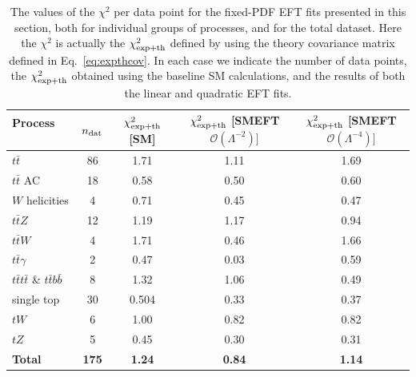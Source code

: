\documentclass[withindex,glossary]{cam-thesis}
\begin{document}
\begin{table}[t!]
\begin{center}
\centering
\renewcommand{\arraystretch}{1.4}
\begin{tabularx}{\textwidth}{lcccc}
\toprule
Process  $\qquad $ & $n_{\rm dat}$ &  {\footnotesize$\chi^2_{\rm exp+th}$ [SM]} & {\footnotesize$\chi^2_{\rm exp+th}$ [SMEFT $\mathcal{O}(\Lambda^{-2})]$ }
& {\footnotesize$\chi^2_{\rm exp+th}$  [SMEFT $\mathcal{O}(\Lambda^{-4})]$}
\\ \midrule
	$t \bar{t}$ & 86 & 1.71 & 1.11 & 1.69 \\
	$t \bar{t}$ AC & 18 & 0.58 & 0.50 & 0.60 \\
	$W$ helicities & 4 & 0.71 & 0.45 & 0.47  \\
        \midrule
        $t\bar{t}Z$ & 12 & 1.19 & 1.17 & 0.94  \\ 
        $t\bar{t}W$ & 4 & 1.71 & 0.46 & 1.66 \\
        $t \bar{t} \gamma$ & 2 & 0.47 & 0.03 & 0.59 \\ 
        \midrule
        $t \bar{t} t \bar{t}$ \& $t \bar{t} b \bar{b}$ & 8 & 1.32 & 1.06 & 0.49  \\
        \midrule
        single top & 30 & 0.504& 0.33 & 0.37  \\ 
        $tW$ & 6 & 1.00 & 0.82 & 0.82 \\ 
        $tZ$ & 5 & 0.45 & 0.30 & 0.31 \\
        \midrule
        {\bf Total} & {\bf 175} & {\bf 1.24} & {\bf 0.84} & {\bf 1.14}  \\ 
\bottomrule
\end{tabularx}
\end{center}
\caption{The values of the $\chi^2$ per data point for the fixed-PDF EFT fits presented in this section,
  both for individual groups of processes, and for the total
  dataset. Here the $\chi^2$ is actually the $\chi^2_{\rm exp+th}$
  defined by using the theory covariance matrix defined in
  Eq.~\eqref{eq:expthcov}. 
  In each case we indicate the number of data points, the $\chi^2_{\rm exp+th}$ obtained using the baseline
  SM calculations, and the results of both the linear and quadratic EFT fits.
}
\label{tab:smeft_fit_quality}
\end{table}
\end{document}
